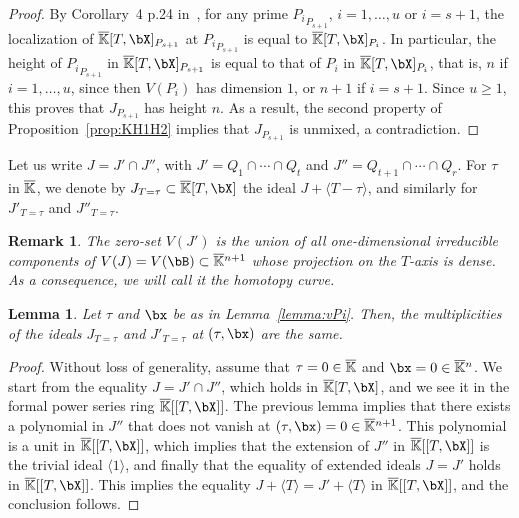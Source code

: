 \documentclass[12pt]{article}
\newtheorem{lemma}[definition]{Lemma}
\newtheorem{remark}[definition]{Remark}
\begin{document}
\begin{proof}
  By Corollary~4 p.24 in~\cite{Matsumura86}, for any prime
  ${P_i}_{P_{s+1}}$, $i=1,\dots,u$ or $i=s+1$, the localization of
  $\KKbar[T,\bX]_{P_{s+1}}$ at ${P_i}_{P_{s+1}}$ is equal to
  $\KKbar[T,\bX]_{P_{i}}$. In particular, the height of
  ${P_i}_{P_{s+1}}$ in $\KKbar[T,\bX]_{P_{s+1}}$ is equal to that of
  $P_i$ in $\KKbar[T,\bX]_{P_{i}}$, that is, $n$ if $i=1,\dots,u$,
  since then $V(P_i)$ has dimension $1$, or $n+1$ if $i=s+1$. Since $u
  \ge 1$, this proves that $J_{P_{s+1}}$ has height $n$. As a result,
  the second property of Proposition~\ref{prop:KH1H2} implies that
  $J_{P_{s+1}}$ is unmixed, a contradiction.
\end{proof}

Let us write $J=J' \cap J''$, with $J'=Q_1 \cap \cdots \cap Q_t$ and
$J''=Q_{t+1} \cap \cdots \cap Q_r$. For $\tau$ in $\overline{\mathbb{K}}$, we denote
by $J_{T=\tau} \subset \KKbar[T,\bX]$ the ideal $J + \langle T-\tau \rangle$,
and similarly for $J'_{T=\tau}$ and $ J''_{T=\tau}$.

\begin{remark}\label{rem:Jprime}
  The zero-set $V(J')$ is the union of all one-dimensional irreducible
  components of $V(J)=V(\bB) \subset \KKbar{}^{n+1}$ whose projection on
  the $T$-axis is dense. As a consequence, we will call it the {\em
    homotopy curve}.
\end{remark}

\begin{lemma}\label{lemma:JJprime}
  Let $\tau$ and $\bx$ be as in Lemma~\ref{lemma:vPi}. Then, the
  multiplicities of the ideals $J_{T=\tau}$ and $J'_{T=\tau}$ at $(\tau,\bx)$
  are the same.
\end{lemma}
\begin{proof}
  Without loss of generality, assume that $\tau=0 \in \overline{\mathbb{K}}$ and
  $\bx=0 \in \KKbar{}^n$. We start from the equality $J=J' \cap J''$,
  which holds in $\KKbar[T,\bX]$, and we see it in the formal power
  series ring $\KKbar[[T,\bX]]$.  The previous lemma implies that
  there exists a polynomial in $J''$ that does not vanish at
  $(\tau,\bx)=0 \in \KKbar{}^{n+1}$.  This polynomial is a unit in
  $\KKbar[[T,\bX]]$, which implies that the extension of $J''$ in
  $\KKbar[[T,\bX]]$ is the trivial ideal $\langle 1 \rangle$, and
  finally that the equality of extended ideals $J=J'$ holds in
  $\KKbar[[T,\bX]]$. This implies the equality
  $J+\langle T \rangle =J'+\langle T \rangle $ in $\KKbar[[T,\bX]]$,
  and the conclusion follows.
\end{proof}
\end{document}
